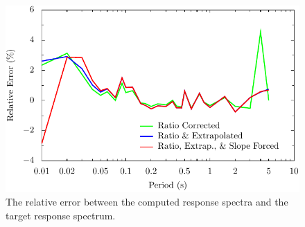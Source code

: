 \documentclass[11pt]{report}
\begin{document}
\begin{figure}[tb]
  \begin{center}
	\includegraphics[width=\linewidth]{figures/siteResponse/irvt-error.pdf}
  \end{center}
  \caption{The relative error between the computed response spectra and the target response spectrum.}
  \label{fig:irvt:error}
\end{figure}

\clearpage
\end{document}
